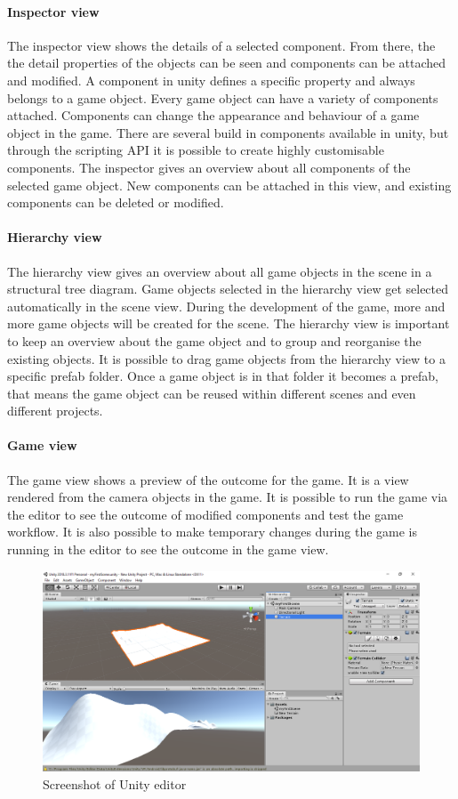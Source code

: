 \paragraph{Inspector view}
The inspector view shows the details of a selected component. From there, the the detail properties of the objects can be seen and components can be attached and modified. A component in unity defines a specific property and always belongs to a game object. Every game object can have a variety of components attached. Components can change the appearance and behaviour of a game object in the game. There are several build in components available in unity, but through the scripting API it is possible to create highly customisable components. The inspector gives an overview about all components of the selected game object. New components can be attached in this view, and existing components can be deleted or modified.
\paragraph{Hierarchy view}
The hierarchy view gives an overview about all game objects in the scene in a structural tree diagram. Game objects selected in the hierarchy view get selected automatically in the scene view. During the development of the game, more and more game objects will be created for the scene. The hierarchy view is important to keep an overview about the game object and to group and reorganise the existing objects. It is possible to drag game objects from the hierarchy view to a specific prefab folder. Once a game object is in that folder it becomes a prefab, that means the game object can be reused within different scenes and even different projects.
\paragraph{Game view}
The game view shows a preview of the outcome for the game. It is a view rendered from the camera objects in the game. It is possible to run the game via the editor to see the outcome of modified components and test the game workflow. It is also possible to make temporary changes during the game is running in the editor to see the outcome in the game view.
\begin{figure}[h!]
  \includegraphics[width=16cm]{kapitel/editor.PNG}
  \centering
  \caption{Screenshot of Unity editor}
  \label{fig:unity-editor}
\end{figure}
